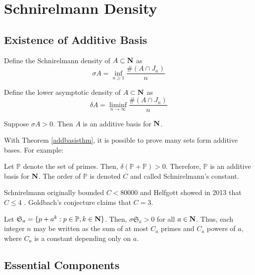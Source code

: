 \section{Schnirelmann Density}

\subsection{Existence of Additive Basis}

\begin{definition}
    Define the Schnirelmann density of $A\subset \mathbf{N}$ as
    $$\sigma A=\inf_{n\ge1}\frac{\#(A\cap J_n)}{n}$$
\end{definition}

\begin{definition}
    Define the lower asymptotic density of $A\subset \mathbf{N}$ as
    $$\delta A=\liminf_{n\to\infty}\frac{\#(A\cap J_n)}{n}$$
\end{definition}

\begin{theorem}
    Suppose $\sigma A>0$. Then $A$ is an additive basis for $\mathbf{N}$. \label{addbasisthm}
\end{theorem}

With Theorem \ref{addbasisthm}, it is possible to prove many sets form additive bases. For example:

\begin{theorem}
    Let $\mathbb P$ denote the set of primes. Then, $\delta(\mathbb P+\mathbb P)>0$. Therefore, $\mathbb P$ is an additive basis for $\mathbf{N}$. The order of $\mathbb P$ is denoted $C$ and called Schnirelmann's constant.
\end{theorem}

Schnirelmann originally bounded $C<80000$ and Helfgott showed in 2013 that $C\le4$ \cite{helfgott2015ternarygoldbachproblem}. Goldbach's conjecture claims that $C=3$.

\begin{theorem}
    Let $\mathfrak S_a=\{p+a^k:p\in\mathbb P, k\in\mathbf{N}\}$. Then, $\sigma\mathfrak S_a>0$ for all $a\in\mathbf{N}$. Thus, each integer $n$ may be written as the sum of at most $C_a$ primes and $C_a$ powers of $a$, where $C_a$ is a constant depending only on $a$.
\end{theorem}


\subsection{Essential Components}

